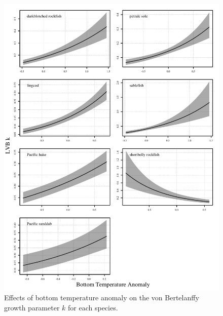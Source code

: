\documentclass[
]{article}
\begin{document}
\begin{figure}
\caption{Effects of bottom temperature anomaly on the von Bertelanffy growth parameter $k$ for each species.}\label{temp_effect_k}
\begin{center}
\includegraphics[height = 0.8\textheight]{../results/ss_lvb_temp/temp_effect_by_species.pdf}
\end{center}
\end{figure}
\end{document}
